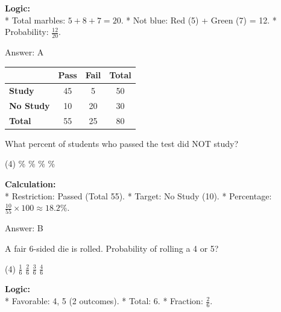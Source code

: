 \documentclass[11pt,paper=a4,answers]{exam}
\begin{document}
\begin{questions}
\begin{solution}
\textbf{Logic:} \\
* Total marbles: $5 + 8 + 7 = 20$.
* Not blue: Red (5) + Green (7) = 12.
* Probability: $\frac{12}{20}$.

\vspace{30pt}

Answer: \colorbox{yellow!100}{A}
\end{solution}

\vspace{60pt}

\question
\begin{center}
\begin{tabular}{|l|c|c|c|}
\hline
 & \textbf{Pass} & \textbf{Fail} & \textbf{Total} \\ \hline
\textbf{Study} & 45 & 5 & 50 \\ \hline
\textbf{No Study} & 10 & 20 & 30 \\ \hline
\textbf{Total} & 55 & 25 & 80 \\ \hline
\end{tabular}
\end{center}
What percent of students who passed the test did NOT study?
\begin{tasks}(4)
    \%
    \%
    \%
    \%
\end{tasks}

\begin{solution}
\textbf{Calculation:} \\
* Restriction: Passed (Total 55).
* Target: No Study (10).
* Percentage: $\frac{10}{55} \times 100 \approx 18.2\%$.

\vspace{30pt}

Answer: \colorbox{yellow!100}{B}
\end{solution}

\vspace{60pt}

\question
A fair 6-sided die is rolled. Probability of rolling a 4 or 5?
\begin{tasks}(4)
    \task $\frac{1}{6}$
    \task $\frac{2}{6}$
    \task $\frac{3}{6}$
    \task $\frac{4}{6}$
\end{tasks}

\begin{solution}
\textbf{Logic:} \\
* Favorable: {4, 5} (2 outcomes).
* Total: 6.
* Fraction: $\frac{2}{6}$.


\end{solution}
\end{questions}
\end{document}
